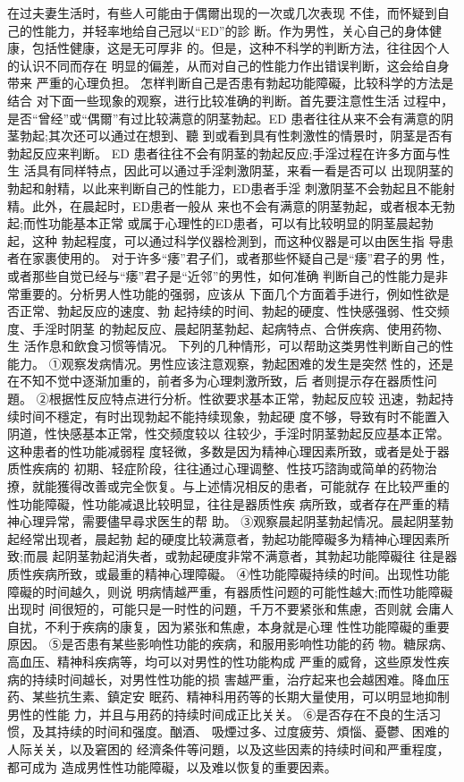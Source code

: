 \documentclass[12pt,UTF8]{ctexbook}
\begin{document}
在过夫妻生活时，有些人可能由于偶爾出现的一次或几次表现
不佳，而怀疑到自己的性能力，并轻率地给自己冠以“ED”的診
断。作为男性，关心自己的身体健康，包括性健康，这是无可厚非
的。但是，这种不科学的判断方法，往往因个人的认识不同而存在
明显的偏差，从而对自己的性能力作出错误判断，这会给自身带来
严重的心理负担。
怎样判断自己是否患有勃起功能障礙，比较科学的方法是结合
对下面一些现象的观察，进行比较准确的判断。首先要注意性生活
过程中，是否“曾经”或“偶爾”有过比较满意的阴茎勃起。ED
患者往往从来不会有满意的阴茎勃起;其次还可以通过在想到、聽
到或看到具有性刺激性的情景时，阴茎是否有勃起反应来判断。
ED 患者往往不会有阴茎的勃起反应;手淫过程在许多方面与性生
活具有同样特点，因此可以通过手淫刺激阴茎，来看一看是否可以
出现阴茎的勃起和射精，以此来判断自己的性能力，ED患者手淫
刺激阴茎不会勃起且不能射精。此外，在晨起时，ED患者一般从
来也不会有满意的阴茎勃起，或者根本无勃起;而性功能基本正常
或属于心理性的ED患者，可以有比较明显的阴茎晨起勃起，这种
勃起程度，可以通过科学仪器检測到，而这种仪器是可以由医生指
导患者在家裹使用的。
对于许多“痿”君子们，或者那些怀疑自己是“痿”君子的男
性，或者那些自觉已经与“痿”君子是“近邻”的男性，如何准确
判断自己的性能力是非常重要的。分析男人性功能的强弱，应该从
下面几个方面着手进行，例如性欲是否正常、勃起反应的速度、勃
起持续的时间、勃起的硬度、性快感强弱、性交频度、手淫时阴茎
的勃起反应、晨起阴茎勃起、起病特点、合併疾病、使用药物、生
活作息和飲食习惯等情况。
下列的几种情形，可以帮助这类男性判断自己的性能力。
①观察发病情况。男性应该注意观察，勃起困难的发生是突然
性的，还是在不知不觉中逐渐加重的，前者多为心理刺激所致，后
者则提示存在器质性问題。
②根据性反应特点进行分析。性欲要求基本正常，勃起反应较
迅速，勃起持续时间不穩定，有时出现勃起不能持续现象，勃起硬
度不够，导致有时不能置入阴道，性快感基本正常，性交频度较以
往较少，手淫时阴茎勃起反应基本正常。这种患者的性功能减弱程
度轻微，多数是因为精神心理因素所致，或者是处于器质性疾病的
初期、轻症阶段，往往通过心理调整、性技巧諮詢或简单的药物治
撩，就能獲得改善或完全恢复。与上述情况相反的患者，可能就存
在比较严重的性功能障礙，性功能减退比较明显，往往是器质性疾
病所致，或者存在严重的精神心理异常，需要儘早尋求医生的帮
助。
③观察晨起阴茎勃起情况。晨起阴茎勃起经常出现者，晨起勃
起的硬度比较满意者，勃起功能障礙多为精神心理因素所致;而晨
起阴茎勃起消失者，或勃起硬度非常不满意者，其勃起功能障礙往
往是器质性疾病所致，或最重的精神心理障礙。
④性功能障礙持续的时间。出现性功能障礙的时间越久，则说
明病情越严重，有器质性问题的可能性越大;而性功能障礙出现时
间很短的，可能只是一时性的问題，千万不要紧张和焦慮，否则就
会庸人自扰，不利于疾病的康复，因为紧张和焦慮，本身就是心理
性性功能障礙的重要原因。
⑤是否患有某些影响性功能的疾病，和服用影响性功能的药
物。糖尿病、高血压、精神科疾病等，均可以对男性的性功能构成
严重的威脅，这些原发性疾病的持续时间越长，对男性性功能的损
害越严重，治疗起来也会越困难。降血压药、某些抗生素、鎮定安
眠药、精神科用药等的长期大量使用，可以明显地抑制男性的性能
力，并且与用药的持续时间成正比关关。
⑥是否存在不良的生活习惯，及其持续的时间和强度。酗酒、
吸煙过多、过度疲劳、煩惱、憂鬱、困难的人际关关，以及窘困的
经濟条件等问題，以及这些因素的持续时间和严重程度，都可成为
造成男性性功能障礙，以及难以恢复的重要因素。
\end{document}
